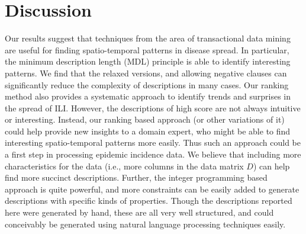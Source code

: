 \section*{Discussion}
Our results suggest that techniques from the area of transactional data mining 
are useful for finding spatio-temporal patterns in disease spread.
In particular, the minimum description length (MDL) principle is able to identify 
interesting patterns. 
We find that the relaxed versions, and allowing negative clauses
can significantly reduce the complexity of descriptions in many cases. 
Our ranking method also provides a systematic approach to identify trends and
surprises in the spread of ILI.
However, the descriptions of high score are not always intuitive
or interesting. Instead, our ranking based approach (or other variations of it) could
help provide new insights to a domain expert, who might be able to find 
interesting spatio-temporal patterns more easily. Thus such an approach could be a first
step in processing epidemic incidence data.
We believe that including more characteristics for the data (i.e., more columns in the
data matrix $D$) can help find more succinct descriptions.
Further, the integer programming based approach is quite powerful, and more
constraints can be easily added to generate descriptions with specific kinds of properties.
Though the descriptions reported here were generated by hand,
these are all very well structured, and could conceivably be generated using
natural language processing techniques easily.



